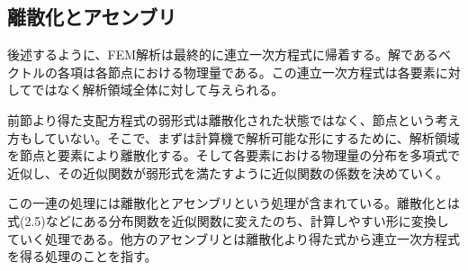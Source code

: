 \documentclass[dvipdfmx, 9pt, a4paper]{jsarticle}
\numberwithin{equation}{section}
\begin{document}
\subsection{離散化とアセンブリ}
後述するように、FEM解析は最終的に連立一次方程式に帰着する。解であるベクトルの各項は各節点における物理量である。この連立一次方程式は各要素に対してではなく解析領域全体に対して与えられる。\par
前節より得た支配方程式の弱形式は離散化された状態ではなく、節点という考え方もしていない。そこで、まずは計算機で解析可能な形にするために、解析領域を節点と要素により離散化する。そして各要素における物理量の分布を多項式で近似し、その近似関数が弱形式を満たすように近似関数の係数を決めていく。\par
この一連の処理には離散化とアセンブリという処理が含まれている。離散化とは式(2.5)などにある分布関数を近似関数に変えたのち、計算しやすい形に変換していく処理である。他方のアセンブリとは離散化より得た式から連立一次方程式を得る処理のことを指す。
\end{document}
